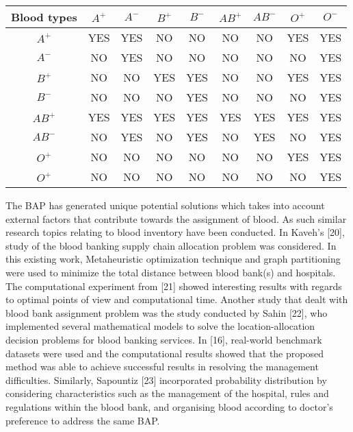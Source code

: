 \documentclass{article}
\begin{document}
    
\begin{center}
\begin {tabular}{|c|c|c|c|c|c|c|c|c|}
\hline

Blood types& $A^+$&$A^-$&$B^+$& $B^-$& $AB^+$& $AB^-$&  $O^+$& $O^-$ \\ [0.5ex]
\hline
 $A^+$&YES&YES&NO&NO&NO&NO&YES&YES\\
 $A^-$&NO&YES&NO&NO&NO&NO&NO&YES\\
 $B^+$&NO&NO&YES&YES&NO&NO&YES&YES\\
$B^-$&NO&NO&NO&YES&NO&NO&NO&YES\\
$AB^+$&YES&YES&YES&YES&YES&YES&YES&YES\\
$AB^-$&NO&YES&NO&YES&NO&YES&NO&YES\\
$O^+$&NO&NO&NO&NO&NO&NO&YES&YES\\
$O^+$&NO&NO&NO&NO&NO&NO&NO&YES\\
\hline

\end {tabular}

\end {center}
The BAP has generated unique potential solutions which takes into account external factors that contribute towards the assignment of blood. As such similar research topics relating to blood inventory have been conducted. In Kaveh’s [20], study of the blood banking supply chain allocation problem was considered. In this existing work, Metaheuristic optimization technique and graph partitioning were used to minimize the total distance between blood bank(s) and hospitals. The computational experiment from [21] showed interesting results with regards to optimal points of view and computational time. Another study that dealt with blood bank assignment problem was the study conducted by Sahin [22], who implemented several mathematical models to solve the location-allocation decision problems for blood banking services. In [16], real-world benchmark datasets were used and the computational results showed that the proposed method was able to achieve successful results in resolving the management difficulties. Similarly, Sapountiz [23] incorporated probability distribution by considering characteristics such as the management of the hospital, rules and regulations within the blood bank, and organising blood according to doctor’s preference to address the same BAP.
\\
\\
\end{document}

